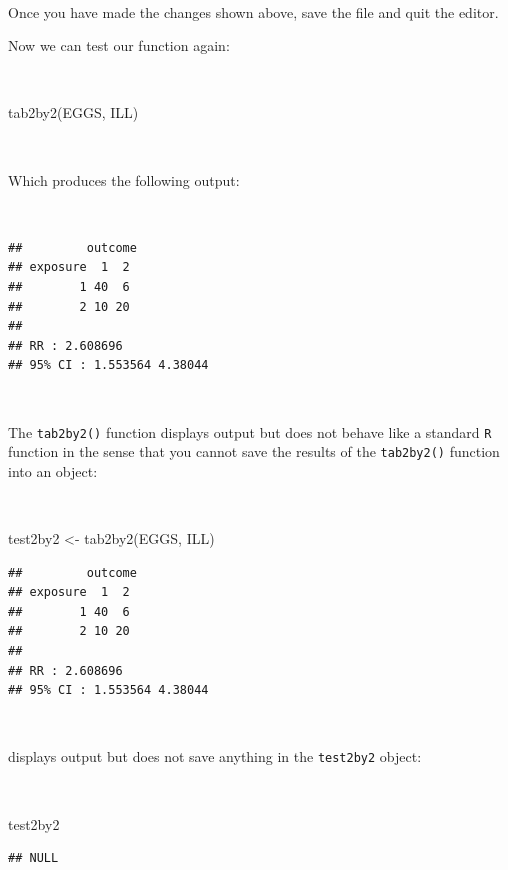 \documentclass[
  12pt,
]{book}
\newenvironment{Shaded}{\begin{snugshade}}{\end{snugshade}}
\newcommand{\FunctionTok}[1]{\textcolor[rgb]{0.00,0.00,0.00}{#1}}
\newcommand{\NormalTok}[1]{#1}
\newcommand{\OtherTok}[1]{\textcolor[rgb]{0.56,0.35,0.01}{#1}}
\begin{document}
~

Once you have made the changes shown above, save the file and quit the editor.

\newpage

Now we can test our function again:

~

\begin{Shaded}
\begin{Highlighting}[]
\FunctionTok{tab2by2}\NormalTok{(EGGS, ILL)}
\end{Highlighting}
\end{Shaded}

~

Which produces the following output:

~

\begin{verbatim}
##         outcome
## exposure  1  2
##        1 40  6
##        2 10 20
## 
## RR : 2.608696 
## 95% CI : 1.553564 4.38044
\end{verbatim}

~

The \texttt{tab2by2()} function displays output but does not behave like a standard \texttt{R} function in the sense that you cannot save the results of the \texttt{tab2by2()} function into an object:

~

\begin{Shaded}
\begin{Highlighting}[]
\NormalTok{test2by2 }\OtherTok{\textless{}{-}} \FunctionTok{tab2by2}\NormalTok{(EGGS, ILL)}
\end{Highlighting}
\end{Shaded}

\begin{verbatim}
##         outcome
## exposure  1  2
##        1 40  6
##        2 10 20
## 
## RR : 2.608696 
## 95% CI : 1.553564 4.38044
\end{verbatim}

~

displays output but does not save anything in the \texttt{test2by2} object:

~

\begin{Shaded}
\begin{Highlighting}[]
\NormalTok{test2by2}
\end{Highlighting}
\end{Shaded}

\begin{verbatim}
## NULL
\end{verbatim}
\end{document}
